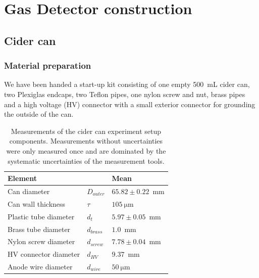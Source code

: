 \section{Gas Detector construction}
\label{sec:construction}

\subsection{Cider can}
\subsubsection{Material preparation}
We have been handed a start-up kit consisting of one empty \SI{500}{\milli\liter}
cider can, two Plexiglas endcaps, two Teflon pipes, one nylon screw and nut,
brass pipes and a high voltage (HV) connector with a small exterior connector for
grounding the outside of the can.

\begin{table}[htb!]%
\begin{maybeleft}%
  \begin{tabularx}{\linewidth}{p{3.6cm}p{0.7cm}p{3cm}}
    \textbf{Element}       &               & \textbf{Mean} \\ \hline
    Can diameter           & $D_{outer}$   & $65.82 \pm 0.22$~mm     \\
    Can wall thickness     & $\tau$        & $\SI{105}{\micro\meter}$   \\
    Plastic tube diameter  & $d_{t}$       & $5.97 \pm 0.05$~mm       \\
    Brass tube diameter    & $d_{brass}$   & $1.0$~mm       \\
    Nylon screw diameter   & $d_{screw}$   & $7.78 \pm 0.04$~mm       \\
    HV connector diameter  & $d_{HV}$      & $9.37$~mm      \\
    Anode wire diameter    & $d_{wire}$    & $\SI{50}{\micro\meter}$    \\
    \hline
  \end{tabularx}
  \caption{Measurements of the cider can experiment setup components. Measurements without uncertainties were only measured once and are dominated by the systematic uncertainties of the measurement tools.}
  \label{Tab:cidercan_sizes}
\end{maybeleft}%
\end{table}

